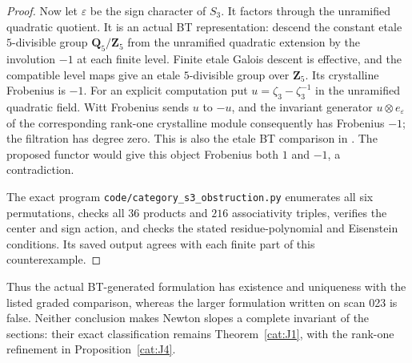 \begin{proof}
Now let $\varepsilon$ be the sign character of $S_3$.  It factors
through the unramified quadratic quotient.  It is an actual BT
representation: descend the constant etale $5$-divisible group
$\mathbf Q_5/\mathbf Z_5$ from the unramified quadratic extension by
the involution $-1$ at each finite level.  Finite etale Galois descent
is effective, and the compatible level maps give an etale
$5$-divisible group over $\mathbf Z_5$.
Its crystalline Frobenius is $-1$.  For an explicit computation put
$u=\zeta_3-\zeta_3^{-1}$ in the unramified quadratic field.  Witt
Frobenius sends $u$ to $-u$, and the invariant generator
$u\otimes e_\varepsilon$ of the corresponding rank-one crystalline
module consequently has Frobenius $-1$; the filtration has degree zero.
This is also the etale BT comparison in
\cite[\S6.2]{catFontaine1982}.
The proposed functor would give this object Frobenius both $1$ and
$-1$, a contradiction.

The exact program \texttt{code/category\_s3\_obstruction.py} enumerates
all six permutations, checks all $36$ products and $216$ associativity
triples, verifies the center and sign action, and checks the stated
residue-polynomial and Eisenstein conditions.  Its saved output agrees
with each finite part of this counterexample.
\end{proof}

Thus the actual BT-generated formulation has existence and uniqueness
with the listed graded comparison, whereas the larger formulation
written on scan 023 is false.  Neither conclusion makes Newton slopes
a complete invariant of the sections: their exact classification remains
Theorem~\ref{cat:J1}, with the rank-one refinement in
Proposition~\ref{cat:J4}.

